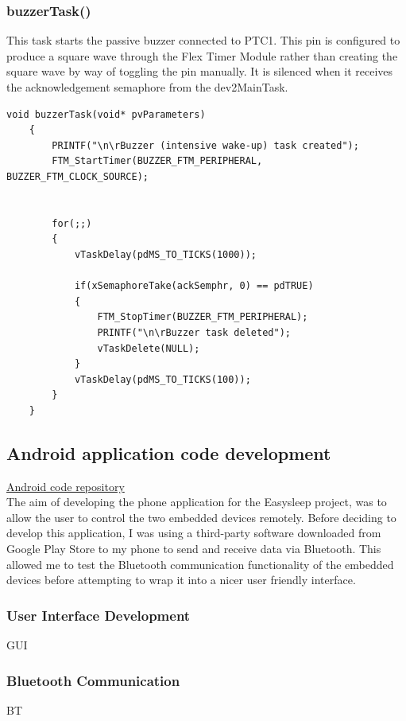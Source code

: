 \documentclass[12pt,a4paper]{article}
\begin{document}
    \subsubsection*{buzzerTask()}
    This task starts the passive buzzer connected to PTC1. This pin is configured to produce a square wave through the Flex Timer Module rather than creating the square wave by way of toggling the pin manually. It is silenced when it receives the acknowledgement semaphore from the dev2MainTask.
    \begin{lstlisting}[label={lst:buzzerTask}, caption=buzzerTask()]
     void buzzerTask(void* pvParameters)
    {
        PRINTF("\n\rBuzzer (intensive wake-up) task created");
        FTM_StartTimer(BUZZER_FTM_PERIPHERAL, BUZZER_FTM_CLOCK_SOURCE);

        
        for(;;)
        {
            vTaskDelay(pdMS_TO_TICKS(1000));

            if(xSemaphoreTake(ackSemphr, 0) == pdTRUE)
            {
                FTM_StopTimer(BUZZER_FTM_PERIPHERAL);
                PRINTF("\n\rBuzzer task deleted");
                vTaskDelete(NULL);
            }
            vTaskDelay(pdMS_TO_TICKS(100));
        }
    }
    \end{lstlisting}

   \subsection{Android application code development}
   \href{https://github.com/zedd-1983/Easysleep_app/tree/bt_connection_3}{Android code repository}\\
   
   The aim of developing the phone application for the Easysleep project, was to allow the user to control the two embedded devices remotely. Before deciding to develop this application, I was using a third-party software downloaded from Google Play Store to my phone to send and receive data via Bluetooth. This allowed me to test the Bluetooth communication functionality of the embedded devices before attempting to wrap it into a nicer user friendly interface.
               
   \subsubsection{User Interface Development}
   GUI\\
   \subsubsection{Bluetooth Communication}
   BT\\
\end{document}
